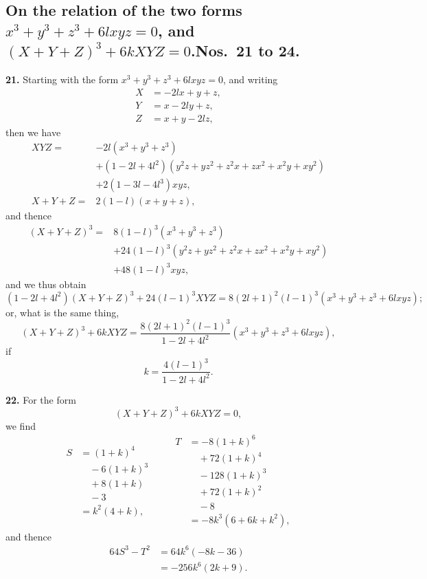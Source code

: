 \documentclass[11pt,a4paper]{article}
\begin{document}
\subsection*{On the relation of the two forms $x^{3} + y^{3} + z^{3} + 6lxyz = 0$, and $(X + Y + Z)^{3} + 6kXYZ = 0$.\quad Nos.\ 21 to 24.}

\textbf{21.} Starting with the form $x^{3} + y^{3} + z^{3} + 6lxyz = 0$, and writing
\[
\begin{aligned}
X &= -2lx + y + z,\\
Y &= x - 2ly + z,\\
Z &= x + y - 2lz,
\end{aligned}
\]
then we have
\[
\begin{aligned}
XYZ ={}& -2l(x^{3} + y^{3} + z^{3})\\
&+ (1 - 2l + 4l^{2})(y^{2}z + yz^{2} + z^{2}x + zx^{2} + x^{2}y + xy^{2})\\
&+ 2(1 - 3l - 4l^{3})xyz,\\
X + Y + Z ={}& 2(1 - l)(x + y + z),
\end{aligned}
\]
and thence
\[
\begin{aligned}
(X + Y + Z)^{3} ={}& 8(1 - l)^{3}(x^{3} + y^{3} + z^{3})\\
&+ 24(1 - l)^{3}(y^{2}z + yz^{2} + z^{2}x + zx^{2} + x^{2}y + xy^{2})\\
&+ 48(1 - l)^{3}xyz,
\end{aligned}
\]
and we thus obtain
\[
(1 - 2l + 4l^{2})(X + Y + Z)^{3} + 24(l - 1)^{3} XYZ = 8(2l + 1)^{2}(l - 1)^{3}(x^{3} + y^{3} + z^{3} + 6lxyz);
\]
or, what is the same thing,
\[
(X + Y + Z)^{3} + 6kXYZ = \frac{8(2l + 1)^{2}(l - 1)^{3}}{1 - 2l + 4l^{2}}(x^{3} + y^{3} + z^{3} + 6lxyz),
\]
if
\[
k = \frac{4(l - 1)^{3}}{1 - 2l + 4l^{2}}.
\]

\textbf{22.} For the form
\[
(X + Y + Z)^{3} + 6kXYZ = 0,
\]
we find
\[
\begin{aligned}
S &= (1 + k)^{4}\\
&\quad -6(1 + k)^{3}\\
&\quad +8(1 + k)\\
&\quad -3\\
&= k^{2}(4 + k),
\end{aligned}
\qquad
\begin{aligned}
T &= -8(1 + k)^{6}\\
&\quad +72(1 + k)^{4}\\
&\quad -128(1 + k)^{3}\\
&\quad +72(1 + k)^{2}\\
&\quad -8\\
&= -8k^{3}(6 + 6k + k^{2}),
\end{aligned}
\]
and thence
\[
\begin{aligned}
64S^{3} - T^{2} &= 64k^{6}(-8k - 36)\\
&= -256k^{6}(2k + 9).
\end{aligned}
\]
\end{document}
